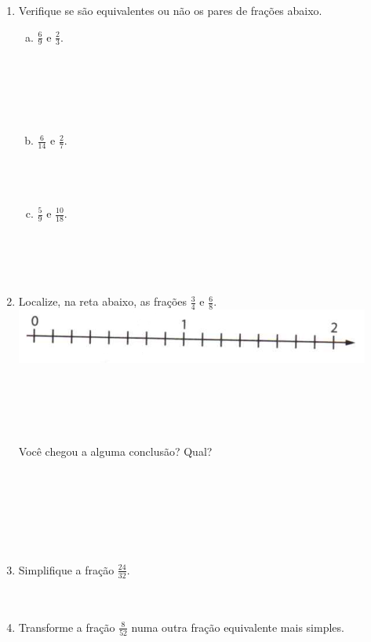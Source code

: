 \documentclass[a4paper,14pt]{article}
\begin{document}
\begin{multicols}{2}
\begin{enumerate}
			\item Verifique se são equivalentes ou não os pares de frações abaixo.
			\begin{enumerate}[a)] 
				\item $\frac{6}{9}$ e $\frac{2}{3}$. \\\\\\\\\\\\
				\item $\frac{6}{14}$ e $\frac{2}{7}$. \\\\\\\\
				\item $\frac{5}{9}$ e $\frac{10}{18}$. \\\\\\\\\
			\end{enumerate}
			\item Localize, na reta abaixo, as frações $\frac{3}{4}$ e $\frac{6}{8}$. \\
			\includegraphics[width=1\linewidth]{6FMA09_imagens/imagem2} \\\\\\\\\\\\
			Você chegou a alguma conclusão? Qual? \\\\\\\\\\\\\\
			\item Simplifique a fração $\frac{24}{32}$. \\\\\\
			\item Transforme a fração $\frac{8}{52}$ numa outra fração equivalente mais simples. \\\\\\\\\\\\\\

\end{enumerate}
\end{multicols}
\end{document}
